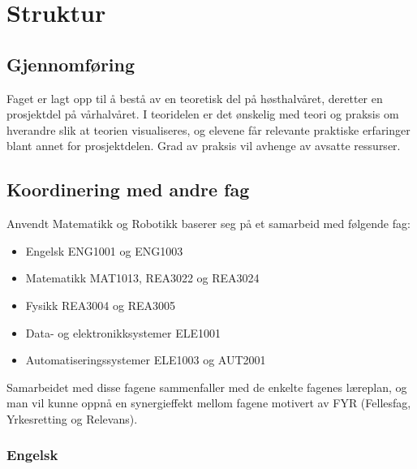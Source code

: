 \section*{Struktur} \label{Sec: Struktur}

	\subsection*{Gjennomføring}

	Faget er lagt opp til å bestå av en teoretisk del på høsthalvåret, deretter en prosjektdel på vårhalvåret. I teoridelen er det ønskelig med teori og praksis om hverandre slik at teorien visualiseres, og elevene får relevante praktiske erfaringer blant annet for prosjektdelen. Grad av praksis vil avhenge av avsatte ressurser.



	\subsection*{Koordinering med andre fag}

	Anvendt Matematikk og Robotikk baserer seg på et samarbeid med følgende fag:

	\begin{itemize}
	\item Engelsk ENG1001 og ENG1003
	\item Matematikk MAT1013, REA3022 og REA3024
	\item Fysikk REA3004 og REA3005
	\item Data- og elektronikksystemer ELE1001
	\item Automatiseringssystemer ELE1003 og AUT2001
	\end{itemize}

	Samarbeidet med disse fagene sammenfaller med de enkelte fagenes læreplan,
	og man vil kunne oppnå en synergieffekt mellom fagene motivert av FYR (Fellesfag, Yrkesretting og Relevans).\\


	\subsubsection*{Engelsk}

